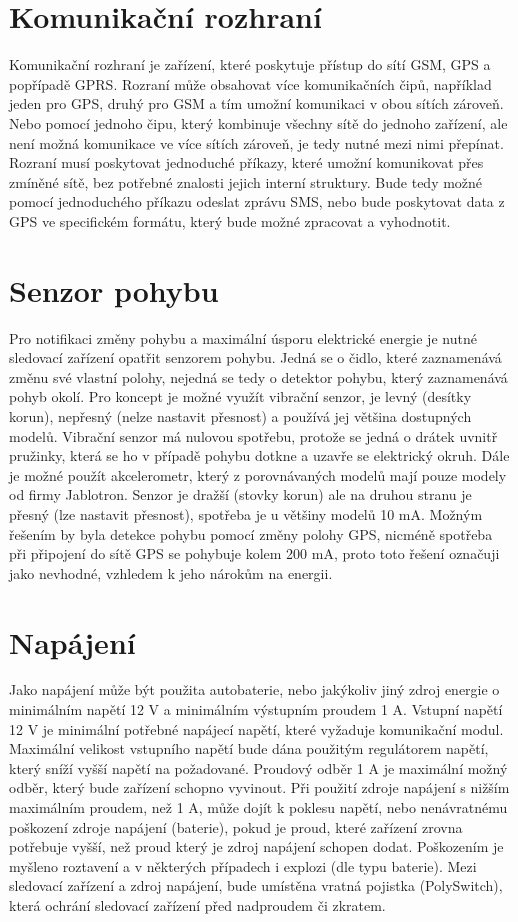 \documentclass[FM,BP]{tulthesis}  %
\begin{document}
\section{Komunikační rozhraní}
Komunikační rozhraní je zařízení, které poskytuje přístup do sítí GSM, GPS a popřípadě GPRS. Rozraní může obsahovat více komunikačních čipů, například jeden pro GPS, druhý pro GSM a tím umožní komunikaci v obou sítích zároveň. Nebo pomocí jednoho čipu, který kombinuje všechny sítě do jednoho zařízení, ale není možná komunikace ve více sítích zároveň, je tedy nutné mezi nimi přepínat. Rozraní musí poskytovat jednoduché příkazy, které umožní komunikovat přes zmíněné sítě, bez potřebné znalosti jejich interní struktury. Bude tedy možné pomocí jednoduchého příkazu odeslat zprávu SMS, nebo bude poskytovat data z GPS ve specifickém formátu, který bude možné zpracovat a vyhodnotit.

\section{Senzor pohybu}
Pro notifikaci změny pohybu a maximální úsporu elektrické energie je nutné sledovací zařízení opatřit senzorem pohybu. Jedná se o čidlo, které zaznamenává změnu své vlastní polohy, nejedná se tedy o detektor pohybu, který zaznamenává pohyb okolí. Pro koncept je možné využít vibrační senzor, je levný (desítky korun), nepřesný (nelze nastavit přesnost) a používá jej většina dostupných modelů. Vibrační senzor má nulovou spotřebu, protože se jedná o drátek uvnitř pružinky, která se ho v případě pohybu dotkne a uzavře se elektrický okruh. Dále je možné použít akcelerometr, který z porovnávaných modelů mají pouze modely od firmy Jablotron. Senzor je dražší (stovky korun) ale na druhou stranu je přesný (lze nastavit přesnost), spotřeba je u většiny modelů 10 mA. Možným řešením by byla detekce pohybu pomocí změny polohy GPS, nicméně spotřeba při připojení do sítě GPS se pohybuje kolem 200 mA, proto toto řešení označuji jako nevhodné, vzhledem k jeho nárokům na energii.

\section{Napájení}
Jako napájení může být použita autobaterie, nebo jakýkoliv jiný zdroj energie o minimálním napětí 12 V a minimálním výstupním proudem 1 A. Vstupní napětí 12 V je minimální potřebné napájecí napětí, které vyžaduje komunikační modul. Maximální velikost vstupního napětí bude dána použitým regulátorem napětí, který sníží vyšší napětí na požadované. Proudový odběr 1 A je maximální možný odběr, který bude zařízení schopno vyvinout. Při použití zdroje napájení s nižším maximálním proudem, než 1 A, může dojít k poklesu napětí, nebo nenávratnému poškození zdroje napájení (baterie), pokud je proud, které zařízení zrovna potřebuje vyšší, než proud který je zdroj napájení schopen dodat. Poškozením je myšleno roztavení a v některých případech i explozi (dle typu baterie). Mezi sledovací zařízení a zdroj napájení, bude umístěna vratná pojistka (PolySwitch), která ochrání sledovací zařízení před nadproudem či zkratem. 
\end{document}
